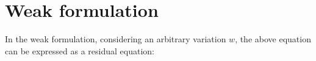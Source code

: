 \documentclass[10pt]{article}
\newcommand{\gv}[1]{\ensuremath{\mbox{\boldmath$ #1 $}}}
\newcommand{\grad}[1]{\gv{\nabla} #1}
\begin{document}
\section{Weak formulation}
In the weak formulation, considering an arbitrary variation $w$, the above equation can be expressed as a residual equation:
\end{document}
